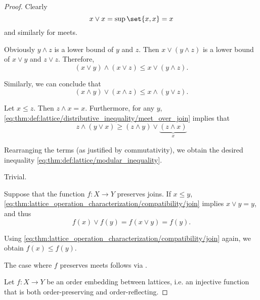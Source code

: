 \begin{proof}
   Clearly
  \begin{equation*}
    x \vee x = \sup\set{ x, x } = x
  \end{equation*}
  and similarly for meets.

   Obviously \( y \wedge z \) is a lower bound of \( y \) and \( z \). Then \( x \vee (y \wedge z) \) is a lower bound of \( x \vee y \) and \( z \vee z \). Therefore,
  \begin{equation*}
    (x \vee y) \wedge (x \vee z) \leq x \vee (y \wedge z).
  \end{equation*}

  Similarly, we can conclude that
  \begin{equation*}
    (x \wedge y) \vee (x \wedge z) \leq x \wedge (y \vee z).
  \end{equation*}

   Let \( x \leq z \). Then \( z \wedge x = x \). Furthermore, for any \( y \), \eqref{eq:thm:def:lattice/distributive_inequality/meet_over_join} implies that
  \begin{equation*}
    z \wedge (y \vee x) \geq (z \wedge y) \vee \underbrace{(z \wedge x)}_{x}
  \end{equation*}

  Rearranging the terms (as justified by commutativity), we obtain the desired inequality \eqref{eq:thm:def:lattice/modular_inequality}.

   Trivial.

   Suppose that the function \( f: X \to Y \) preserves joins. If \( x \leq y \), \eqref{eq:thm:lattice_operation_characterization/compatibility/join} implies \( x \vee y = y \), and thus
  \begin{equation*}
    f(x) \vee f(y) = f(x \vee y) = f(y).
  \end{equation*}

  Using \eqref{eq:thm:lattice_operation_characterization/compatibility/join} again, we obtain \( f(x) \leq f(y) \).

  The case where \( f \) preserves meets follows via .

   Let \( f: X \to Y \) be an order embedding between lattices, i.e. an injective function that is both order-preserving and order-reflecting.


\end{proof}
